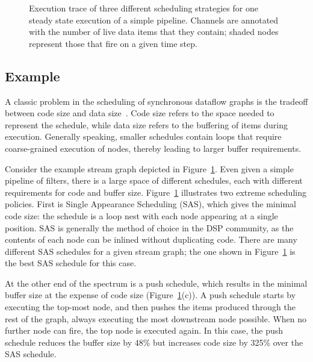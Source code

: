 \documentclass{sig-alt-full}
\begin{document}
\begin{figure}[t]
\caption{\small Execution trace of three different scheduling
strategies for one steady state execution of a simple pipeline.
Channels are annotated with the number of live data items that they
contain; shaded nodes represent those that fire on a given time
step.\protect\label{fig:trace}}
\end{figure}

\subsection{Example}
\label{sec:sched-vs-buffer}

A classic problem in the scheduling of synchronous dataflow graphs is
the tradeoff between code size and data size~\cite{bhat1999x1}.  Code
size refers to the space needed to represent the schedule, while data
size refers to the buffering of items during execution.  Generally
speaking, smaller schedules contain loops that require coarse-grained
execution of nodes, thereby leading to larger buffer requirements.

Consider the example stream graph depicted in Figure~\ref{fig:trace}.
Even given a simple pipeline of filters, there is a large space of
different schedules, each with different requirements for code and
buffer size.  Figure~\ref{fig:trace} illustrates two extreme
scheduling policies.  First is Single Appearance Scheduling (SAS),
which gives the minimal code size: the schedule is a loop nest with
each node appearing at a single position.  SAS is generally the method
of choice in the DSP community, as the contents of each node can be
inlined without duplicating code.  There are many different SAS
schedules for a given stream graph; the one shown in
Figure~\ref{fig:trace} is the best SAS schedule for this case.

At the other end of the spectrum is a push schedule, which results in
the minimal buffer size at the expense of code size
(Figure~\ref{fig:trace}(c)).  A push schedule starts by executing the
top-most node, and then pushes the items produced through the rest of
the graph, always executing the most downstream node possible.  When
no further node can fire, the top node is executed again.  In this
case, the push schedule reduces the buffer size by 48\% but increases
code size by 325\% over the SAS schedule.
\end{document}
